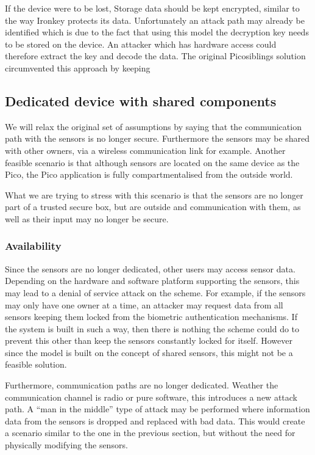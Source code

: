 	If the device were to be lost, 
	Storage data should be kept encrypted, similar to the way Ironkey \cite{} protects its data. Unfortunately an attack path may already be identified which is due to the fact that using this model the decryption key needs to be stored on the device. An attacker which has hardware access could therefore extract the key and decode the data. The original Picosiblings solution circumvented this approach by keeping 

\subsection{Dedicated device with shared components}
We will relax the original set of assumptions by saying that the communication path with the sensors is no longer secure. Furthermore the sensors may be shared with other owners, via a wireless communication link for example. Another feasible scenario is that although sensors are located on the same device as the Pico, the Pico application is fully compartmentalised from the outside world. 

What we are trying to stress with this scenario is that the sensors are no longer part of a trusted secure box, but are outside and communication with them, as well as their input may no longer be secure.

	\subsubsection*{Availability}
	Since the sensors are no longer dedicated, other users may access sensor data. Depending on the hardware and software platform supporting the sensors, this may lead to a denial of service attack on the scheme. For example, if the sensors may only have one owner at a time, an attacker may request data from all sensors keeping them locked from the biometric authentication mechanisms. If the system is built in such a way, then there is nothing the scheme could do to prevent this other than keep the sensors constantly locked for itself. However since the model is built on the concept of shared sensors, this might not be a feasible solution.
	
	Furthermore, communication paths are no longer dedicated. Weather the communication channel is radio or pure software, this introduces a new attack path. A ``man in the middle'' type of attack may be performed where information data from the sensors is dropped and replaced with bad data. This would create a scenario similar to the one in the previous section, but without the need for physically modifying the sensors.
	
